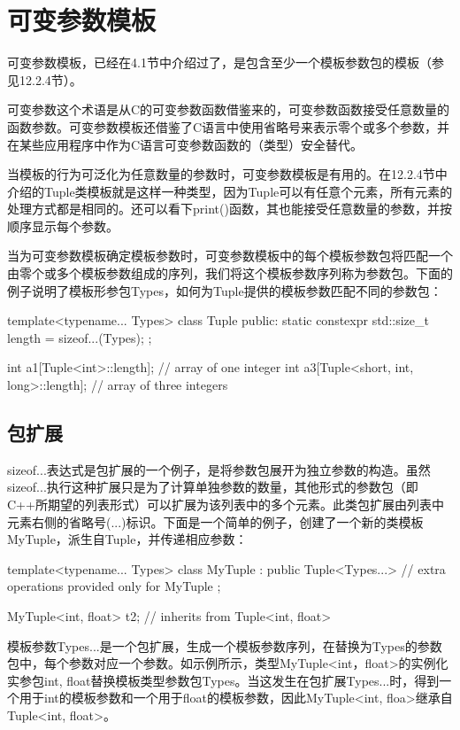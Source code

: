 \section{可变参数模板}

可变参数模板，已经在4.1节中介绍过了，是包含至少一个模板参数包的模板（参见12.2.4节）。

\begin{notice}
可变参数这个术语是从C的可变参数函数借鉴来的，可变参数函数接受任意数量的函数参数。可变参数模板还借鉴了C语言中使用省略号来表示零个或多个参数，并在某些应用程序中作为C语言可变参数函数的（类型）安全替代。
\end{notice}

当模板的行为可泛化为任意数量的参数时，可变参数模板是有用的。在12.2.4节中介绍的Tuple类模板就是这样一种类型，因为Tuple可以有任意个元素，所有元素的处理方式都是相同的。还可以看下print()函数，其也能接受任意数量的参数，并按顺序显示每个参数。

当为可变参数模板确定模板参数时，可变参数模板中的每个模板参数包将匹配一个由零个或多个模板参数组成的序列，我们将这个模板参数序列称为参数包。下面的例子说明了模板形参包Types，如何为Tuple提供的模板参数匹配不同的参数包：

\begin{cpp}
template<typename... Types>
class Tuple {
	public:
	static constexpr std::size_t length = sizeof...(Types);
};

int a1[Tuple<int>::length]; // array of one integer
int a3[Tuple<short, int, long>::length]; // array of three integers
\end{cpp}

\subsection{包扩展}

sizeof...表达式是包扩展的一个例子，是将参数包展开为独立参数的构造。虽然sizeof...执行这种扩展只是为了计算单独参数的数量，其他形式的参数包（即C++所期望的列表形式）可以扩展为该列表中的多个元素。此类包扩展由列表中元素右侧的省略号(...)标识。下面是一个简单的例子，创建了一个新的类模板MyTuple，派生自Tuple，并传递相应参数：

\begin{cpp}
template<typename... Types>
class MyTuple : public Tuple<Types...> {
	// extra operations provided only for MyTuple
};

MyTuple<int, float> t2; // inherits from Tuple<int, float>
\end{cpp}

模板参数Types...是一个包扩展，生成一个模板参数序列，在替换为Types的参数包中，每个参数对应一个参数。如示例所示，类型MyTuple<int，float>的实例化实参包int, float替换模板类型参数包Types。当这发生在包扩展Types...时，得到一个用于int的模板参数和一个用于float的模板参数，因此MyTuple<int, floa>继承自Tuple<int, float>。


